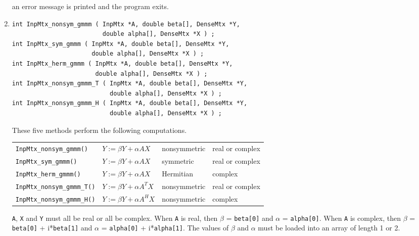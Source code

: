\begin{enumerate}
an error message is printed and the program exits.
\item
\begin{verbatim}
int InpMtx_nonsym_gmmm ( InpMtx *A, double beta[], DenseMtx *Y, 
                         double alpha[], DenseMtx *X ) ;
int InpMtx_sym_gmmm ( InpMtx *A, double beta[], DenseMtx *Y, 
                      double alpha[], DenseMtx *X ) ;
int InpMtx_herm_gmmm ( InpMtx *A, double beta[], DenseMtx *Y, 
                       double alpha[], DenseMtx *X ) ;
int InpMtx_nonsym_gmmm_T ( InpMtx *A, double beta[], DenseMtx *Y, 
                           double alpha[], DenseMtx *X ) ;
int InpMtx_nonsym_gmmm_H ( InpMtx *A, double beta[], DenseMtx *Y, 
                           double alpha[], DenseMtx *X ) ;
\end{verbatim}
These five methods perform the following computations.
\begin{center}
\begin{tabular}{llll}
{\tt InpMtx\_nonsym\_gmmm()} 
   &  $Y := \beta  Y + \alpha  A  X$
   & nonsymmetric
   & real or complex \\
{\tt InpMtx\_sym\_gmmm()} 
   &  $Y := \beta Y + \alpha A X$
   & symmetric
   & real or complex \\
{\tt InpMtx\_herm\_gmmm()} 
   &  $Y := \beta Y + \alpha A X$
   & Hermitian
   & complex \\
{\tt InpMtx\_nonsym\_gmmm\_T()} 
   &  $Y := \beta Y + \alpha A^T X$
   & nonsymmetric
   & real or complex \\
{\tt InpMtx\_nonsym\_gmmm\_H()} 
   &  $Y := \beta Y + \alpha A^H X$
   & nonsymmetric
   & complex 
\end{tabular}
\end{center}
{\tt A}, {\tt X} and {\tt Y} must all be real or all be complex.
When {\tt A} is real, 
then $\beta$ = {\tt beta[0]}
and $\alpha$ = {\tt alpha[0]}.
When {\tt A} is complex, 
then $\beta$ = {\tt beta[0]} + i*{\tt beta[1]}
and $\alpha$ = {\tt alpha[0]} + i*{\tt alpha[1]}.
The values of $\beta$ and $\alpha$ must be loaded 
into an array of length 1 or 2.
\par {}
\begin{center}

\end{center}
\end{enumerate}
